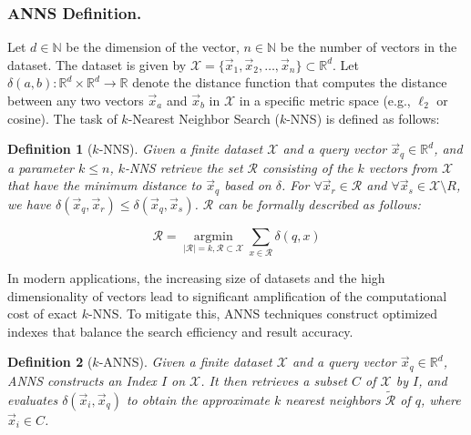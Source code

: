 \documentclass[acmsmall]{acmart}
\theoremstyle{remark}
\theoremstyle{definition}
\newtheorem{definition}{\bf Definition}
\begin{document}
\subsubsection{ANNS Definition.} 

Let $d \in \mathbb{N}$ be the dimension of the vector, $n \in \mathbb{N}$ be the number of vectors in the dataset. The dataset is given by $\mathcal{X} = \{ \vec{x}_1, \vec{x}_2, \ldots, \vec{x}_n\} \subset \mathbb{R}^d$. Let $\delta(a, b) : \mathbb{R}^d \times \mathbb{R}^d \rightarrow \mathbb{R}$ denote the distance function that computes the distance between any two vectors $\vec{x}_a$ and $\vec{x}_b$ in $\mathcal{X}$ in a specific metric space (e.g., $\ell_2$ or cosine). The task of $k$-Nearest Neighbor Search ($k$-NNS) is defined as follows:

\begin{definition}[$k$-NNS]
	\textit{Given a finite dataset $\mathcal{X}$ and a query vector $\vec{x}_q \in \mathbb{R}^d$, and a parameter $k \le n$, $k$-NNS retrieve the set $\mathcal{R}$ consisting of the $k$ vectors from $\mathcal{X}$ that have the minimum distance to $\vec{x}_q$ based on $\mathcal{\delta}$. For $\forall \vec{x}_r \in \mathcal{R}$ and $\forall \vec{x}_s \in \mathcal{X} \setminus R$, we have $\delta(\vec{x}_q, \vec{x}_r) \le \delta(\vec{x}_q, \vec{x}_s)$. $\mathcal{R}$ can be formally described as follows:}
	
	\vspace{-2ex}
	\begin{equation}
		\mathcal{R} = \mathop{\arg\min}\limits_{\lvert \mathcal{R} \rvert = k, \mathcal{R} \subset \mathcal{X}} \sum_{x \in \mathcal{R}} \delta(q, x)
	\end{equation}
	\label{def:knns}
\end{definition}

In modern applications, the increasing size of datasets and the high dimensionality of vectors lead to significant amplification of the computational cost of exact $k$-NNS. To mitigate this, ANNS techniques construct optimized indexes that balance the search efficiency and result accuracy.

\begin{definition}[$k$-ANNS]
	\textit{Given a finite dataset $\mathcal{X}$ and a query vector $\vec{x}_q \in \mathbb{R}^d$, ANNS constructs an Index $I$ on $\mathcal{X}$. It then retrieves a subset $C$ of $\mathcal{X}$ by $I$, and evaluates $\delta(\vec{x}_i, \vec{x}_q)$ to obtain the approximate $k$ nearest neighbors $\mathcal{\tilde{R}}$ of $q$, where $\vec{x}_i \in C$.}
	
	\label{def:anns}
\end{definition}
\end{document}
